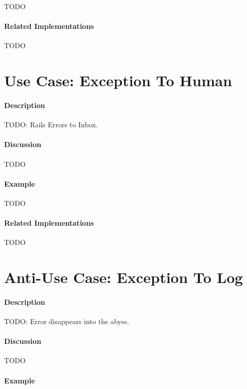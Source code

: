 {\Large TODO}

\paragraph{Related Implementations}

{\Large TODO}

\section{Use Case: Exception To Human}

\paragraph{Description}

{\Large TODO:} Rails Errors to Inbox.

\paragraph{Discussion}

{\Large TODO}

\paragraph{Example}

{\Large TODO}

\paragraph{Related Implementations}

{\Large TODO}

\section{Anti-Use Case: Exception To Log}

\paragraph{Description}

{\Large TODO:} Error disappears into the abyss.

\paragraph{Discussion}

{\Large TODO}

\paragraph{Example}

